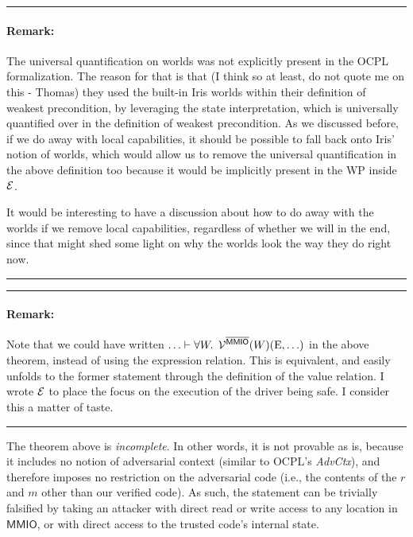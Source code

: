 \documentclass{article}
\newcommand{\X}[1]{\ensuremath{\mathrm{#1}}}
\newcommand{\Sf}[1]{\ensuremath{\mathsf{#1}}}
\newcommand{\MMIO}{\Sf{MMIO}\xspace}
\newenvironment{remark}
{ \bigskip\hrule\vspace{-1.3em}\nobreak
  \paragraph*{Remark:}}
{\vspace*{0.5em}\hrule\medskip}
\begin{document}
\begin{remark}
The universal quantification on worlds was not explicitly present in the OCPL
formalization.
The reason for that is that (I think so at least, do not quote me
on this - Thomas) they
used the built-in Iris worlds within their definition of weakest precondition,
by leveraging the state interpretation, which is universally quantified over in
the definition of weakest precondition.
As we discussed before, if we do away
with local capabilities, it should be possible to fall back onto Iris' notion of
worlds, which would allow us to remove the universal quantification in the
above definition too because it would be implicitly present in the WP inside $\mathcal{E}$.

It would be interesting to have a discussion about how to do away with the
worlds if we remove local capabilities, regardless of whether we will in the
end, since that might shed some light on why the worlds look the way they do
right now.
\end{remark}

\begin{remark}
  Note that we could have written
  $\ldots \vdash \forall W \ldotp \; \VR^{\notMMIO} (W) (\X{E}, \ldots)$
  in the above theorem, instead of using the expression relation. This is
  equivalent, and easily unfolds to the former statement through the definition
  of the value relation. I wrote $\mathcal{E}$ to place the focus on the execution of
  the driver being safe. I consider this a matter of taste.
\end{remark}

\medskip

The theorem above is \emph{incomplete}. In other words, it is not provable as
is, because it includes no notion of adversarial context (similar to OCPL's
\textit{AdvCtx}), and therefore imposes no restriction on the adversarial code
(i.e., the contents of the $r$ and $m$ other than our verified code).
%
As such, the statement can be trivially falsified by taking an attacker with
direct read or write access to any location in \MMIO, or with direct access to
the trusted code's internal state.
\end{document}
